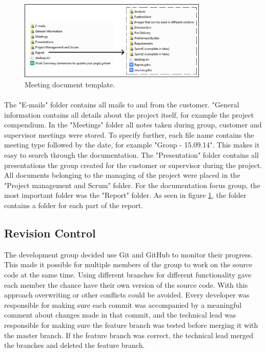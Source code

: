 \begin{figure}[ht!]
\centering
\includegraphics[width=90mm]{./Planning/img/drivestructure}
\caption{Meeting document template. \label{fig:PlanningQualityDocuDrive}}
\end{figure}

\paragraph{} The "E-mails" folder contains all mails to and from the customer. "General information contains all details about the project itself, for example the project compendium. In the "Meetings" folder all notes taken during group, customer and supervisor meetings were stored. To specify further, each file name contains the meeting type followed by the date, for example "Group - 15.09.14". This makes it easy to search through the documentation. The "Presentation" folder contains all presentations the group created for the customer or supervisor during the project. All documents belonging to the managing of the project were placed in the "Project management and Scrum" folder. For the documentation focus group, the most important folder was the "Report" folder. As seen in figure \ref{fig:PlanningQualityDocuDrive}, the folder contains a folder for each part of the report.

\subsection{Revision Control}
\label{subsec:PlanningQualityRev}
The development group decided use Git and GitHub to monitor their progress. This made it possible for multiple members of the group to work on the source code at the same time. 
Using different branches for different functionality gave each member the chance have their own version of the source code. With this approach overwriting or other conflicts could be avoided. Every developer was responsible for making sure each commit was accompanied by a meaningful comment about changes made in that commit, and the technical lead was responsible for making sure the feature branch was tested before merging it with the master branch. If the feature branch was correct, the technical lead merged the branches and deleted the feature branch.

